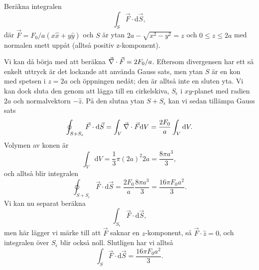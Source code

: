 \documentclass[%
oneside,                 %
final,                   %
10pt]{article}
\newenvironment{notice_mdfboxadmon}[1][]{
\begin{notice_mdfboxmdframed}[frametitle=#1]
}
{
\end{notice_mdfboxmdframed}
}
\begin{document}
\begin{notice_mdfboxadmon}

Beräkna integralen
\begin{equation}
\int_S \vec{F} \cdot \mbox{d}\vec{S},
\end{equation}
där $\vec{F} = F_0/a \left( x\hat{x} + y\hat{y} \right)$ och $S$ är ytan $2a -\sqrt{x^2 - y^2} = z$ och $0\le z \le 2a$ med normalen snett uppåt (alltså positiv z-komponent).

Vi kan då börja med att beräkna $\vec{\nabla} \cdot \vec{F} = 2F_0/a$. Eftersom divergensen har ett så enkelt uttryck är det lockande att  använda Gauss sats, men ytan $S$ är en kon med spetsen i $z = 2a$ och öppningen nedåt; den är alltså inte en sluten yta.  Vi kan dock sluta den genom att lägga till en cirkelskiva, $S_\epsilon$ i $xy$-planet med radien $2a$ och normalvektorn $-\hat{z}$. På den slutna ytan $S+S_\epsilon$ kan vi sedan tillämpa Gauss sats
\begin{equation}
  \oint_{S+S_\epsilon} \vec{F} \cdot \mbox{d}\vec{S} = \int_V \vec{\nabla} \cdot \vec{F}
\mbox{d}V = \frac{2F_0}{a}\int_V\mbox{d}V.
\end{equation}
Volymen av konen är
\begin{equation}
  \int_V\mbox{d}V = \frac{1}{3} \pi \left(2a\right)^2 2a = \frac{8\pi a^3}{3},
\end{equation}
och alltså blir integralen
\begin{equation}
  \oint_{S+S_\epsilon} \vec{F} \cdot \mbox{d}\vec{S} = \frac{2F_0}{a} 
\frac{8\pi a^3}{3} = \frac{16\pi F_0 a^2}{3}.
\end{equation}
Vi kan nu separat beräkna
\begin{equation}
  \int_{S_\epsilon} \vec{F} \cdot \mbox{d}\vec{S},
\end{equation}
men här lägger vi märke till att $\vec{F}$ saknar en $z$-komponent,  så $\vec{F} \cdot \hat{z} = 0$, och integralen över $S_\epsilon$ blir också noll.  Slutligen har vi alltså 
\begin{equation}
  \int_S \vec{F} \cdot \mbox{d}\vec{S} = \frac{16\pi F_0 a^2}{3}.
\end{equation}
\end{notice_mdfboxadmon} %
\end{document}
